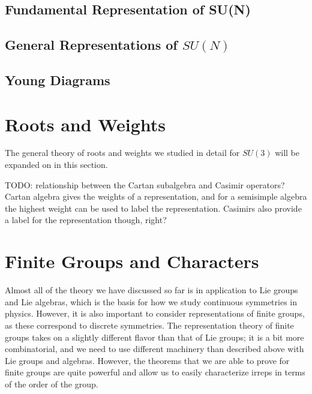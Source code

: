 \documentclass[11pt, oneside]{article}   	%
\theoremstyle{definition}
\begin{document}
\subsection{Fundamental Representation of SU(N)}

\subsection{General Representations of $SU(N)$}

\subsection{Young Diagrams}


\section{Roots and Weights}
\label{sec:weights}

The general theory of roots and weights we studied in detail for $SU(3)$ will be expanded on in this section.

TODO: relationship between the Cartan subalgebra and Casimir operators? Cartan algebra gives the weights of a 
representation, and for a semisimple algebra the highest weight can be used to label the representation. Casimirs 
also provide a label for the representation though, right?


\newpage
\section{Finite Groups and Characters}

Almost all of the theory we have discussed so far is in application to Lie groups and Lie algebras, which is the basis for how 
we study continuous symmetries in physics. However, it is also important to consider representations of finite groups, as 
these correspond to discrete symmetries. The representation theory of finite groups takes on a slightly different flavor than 
that of Lie groups; it is a bit more combinatorial, and we need to use different machinery than described above with Lie groups 
and algebras. However, the theorems that we are able to prove for finite groups are quite powerful and allow us to 
easily characterize irreps in terms of the order of the group. 
\end{document}
